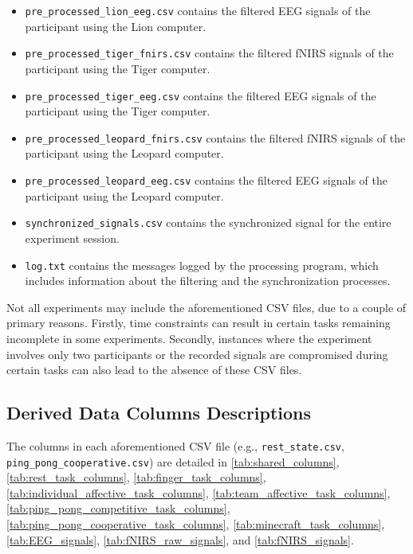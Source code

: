 \begin{itemize}
  \item \texttt{pre\_processed\_lion\_eeg.csv}  contains the filtered EEG signals of the participant using the Lion computer.
  \item \texttt{pre\_processed\_tiger\_fnirs.csv}  contains the filtered fNIRS signals of the participant using the Tiger computer.
  \item \texttt{pre\_processed\_tiger\_eeg.csv}  contains the filtered EEG signals of the participant using the Tiger computer.
  \item \texttt{pre\_processed\_leopard\_fnirs.csv}  contains the filtered fNIRS signals of the participant using the Leopard computer.
  \item \texttt{pre\_processed\_leopard\_eeg.csv}  contains the filtered EEG signals of the participant using the Leopard computer.
  \item \texttt{synchronized\_signals.csv} contains the synchronized signal for the entire experiment session.
  \item \texttt{log.txt} contains the messages logged by the processing program, which includes information about the filtering and the synchronization processes.
\end{itemize}

Not all experiments may include the aforementioned CSV files, due to a couple
of primary reasons. Firstly, time constraints can result in certain tasks
remaining incomplete in some experiments. Secondly, instances where the
experiment involves only two participants or the recorded signals are
compromised during certain tasks can also lead to the absence of these CSV
files.

\subsection{Derived Data Columns Descriptions}
\label{sec:derived_data_cols_desc}

The columns in each aforementioned CSV file (e.g., \texttt{rest\_state.csv},
\texttt{ping\_pong\_cooperative.csv}) are detailed in
\autoref{tab:shared_columns}, \autoref{tab:rest_task_columns},
\autoref{tab:finger_task_columns},
\autoref{tab:individual_affective_task_columns},
\autoref{tab:team_affective_task_columns},
\autoref{tab:ping_pong_competitive_task_columns},
\autoref{tab:ping_pong_cooperative_task_columns},
\autoref{tab:minecraft_task_columns}, \autoref{tab:EEG_signals},
\autoref{tab:fNIRS_raw_signals}, and \autoref{tab:fNIRS_signals}.

